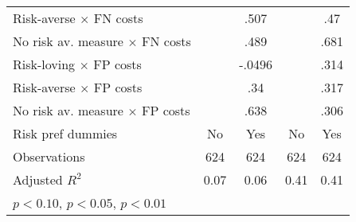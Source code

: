 {\begin{tabular}{l*{4}{c}}
Risk-averse $\times$ FN costs&                  &     .507         &                  &      .47         \\
No risk av. measure $\times$ FN costs&                  &     .489         &                  &     .681         \\
Risk-loving $\times$ FP costs&                  &   -.0496         &                  &     .314         \\
Risk-averse $\times$ FP costs&                  &      .34         &                  &     .317         \\
No risk av. measure $\times$ FP costs&                  &     .638         &                  &     .306         \\
Risk pref dummies &       No         &      Yes         &       No         &      Yes         \\
\hline
Observations    &      624         &      624         &      624         &      624         \\
Adjusted \(R^{2}\)&     0.07         &     0.06         &     0.41         &     0.41         \\
\hline\hline
\multicolumn{5}{l}{\footnotesize \sym{*} \(p<0.10\), \sym{**} \(p<0.05\), \sym{***} \(p<0.01\)}\\
\end{tabular}
}
